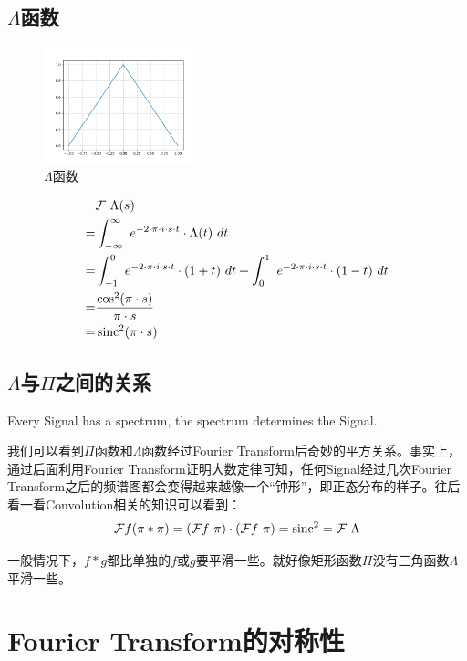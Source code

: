 \subsection{$\Lambda$函数}
\begin{figure}[H]
	\centering
	\includegraphics[width=0.4\textwidth]{assets/Figure_4.png}
	\caption{$\Lambda$函数}
\end{figure}
\begin{align*}
	  & \mathcal{F}\ \Lambda(s)                                                                                                              \\
	= & \int_{-\infty}^{\infty}\ e^{-2\cdot \pi\cdot i\cdot s\cdot t}\cdot \Lambda(t)\ dt                                                    \\
	= & \int_{-1}^{0}\ e^{-2\cdot \pi\cdot i\cdot s\cdot t}\cdot (1+t)\ dt+\int_{0}^{1}\ e^{-2\cdot \pi\cdot i\cdot s\cdot t}\cdot (1-t)\ dt \\
	= & \frac{\cos^2(\pi\cdot s)}{\pi\cdot s}                                                                                                \\
	= & \sinc^2(\pi\cdot s)
\end{align*}
\subsection{$\Lambda$与$\Pi$之间的关系}
Every Signal has a spectrum, the spectrum determines the Signal.

我们可以看到$\Pi$函数和$\Lambda$函数经过Fourier Transform后奇妙的平方关系。事实上，通过后面利用Fourier Transform证明大数定律可知，任何Signal经过几次Fourier Transform之后的频谱图都会变得越来越像一个“钟形”，即正态分布的样子。往后看一看Convolution相关的知识可以看到：
$$
	\mathcal{F}f(\pi*\pi)=(\mathcal{F}f\ \pi)\cdot(\mathcal{F}f\ \pi)=\sinc^2=\mathcal{F}\ \Lambda
$$

一般情况下，$f*g$都比单独的$f$或$g$要平滑一些。就好像矩形函数$\Pi$没有三角函数$\Lambda$平滑一些。
\section{Fourier Transform的对称性}
